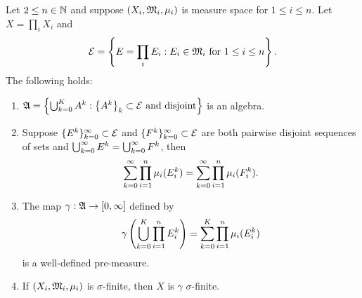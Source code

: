 \documentclass[a4paper]{article}
\begin{document}
\begin{thm}
Let $2 \leq n \in \mathbb{N}$ and suppose $(X_i, \mathfrak{M}_i, \mu_i)$
is measure space for $1 \leq i \leq n$. Let
$X = \prod_i X_i$ and
\[
\mathcal{E} = \left\{ E = \prod_i E_i :
\text{$E_i \in \mathfrak{M}_i$ for $1 \leq i \leq n$} \right\}.
\]
The following holds:
\begin{enumerate}
\item $\mathfrak{A} = \left\{ \bigcup_{k=0}^K A^k :
\text{$\left\{ A^k \right\}_k \subset \mathcal{E}$ and disjoint}
\right\}$ is an algebra.

\item Suppose $\{ E^k \}_{k=0}^\infty \subset \mathcal{E}$ and
$\{ F^k \}_{k=0}^\infty \subset \mathcal{E}$ are both pairwise disjoint sequences
of sets and $\bigcup_{k=0}^\infty{E^k} = \bigcup_{k=0}^\infty{F^k}$, then
\[
\sum_{k=0}^\infty \prod_{i=1}^n \mu_i(E_i^k) =
\sum_{k=0}^\infty \prod_{i=1}^n \mu_i(F_i^k).
\]

\item The map $\gamma: \mathfrak{A} \to [0, \infty]$ defined by
\[
\gamma \left( \bigcup_{k=0}^K \prod_{i=1}^n E_i^k \right)
= \sum_{k=0}^K \prod_{i=1}^n \mu_i(E_i^k)
\]
is a well-defined pre-measure.

\item If $(X_i, \mathfrak{M}_i, \mu_i)$ is $\sigma$-finite, then
$X$ is $\gamma$ $\sigma$-finite.
\end{enumerate}
\end{thm}
\end{document}

